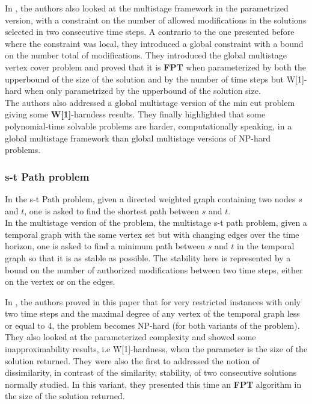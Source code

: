 \documentclass[a4paper]{book}
\begin{document}
In \cite{heeger2019multistage}, the authors also looked at the multistage framework in the parametrized version, with a constraint on the number of allowed modifications in the solutions selected in two consecutive time steps. A contrario to the one presented before where the constraint was local, they introduced a global constraint with a bound on the number total of modifications. They introduced the {\sc global multistage vertex cover} problem and proved that it is \textbf{FPT} when parameterized by both the upperbound of the size of the solution and by the number of time steps but W[1]-hard when only parametrized by the upperbound of the solution size. \\
The authors also addressed a global multistage version of the {\sc min cut} problem giving some \textbf{W[1]}-harndess results. They finally highlighted that some polynomial-time solvable problems are harder, computationally speaking, in a global multistage framework than global multistage versions of NP-hard problems. 

\subsubsection{s-t Path problem}
In the {\sc s-t Path} problem, given a directed weighted graph containing two nodes $s$ and $t$, one is asked to find the shortest path between $s$ and $t$.\\
In the multistage version of the problem, the {\sc multistage s-t path problem}, given a temporal graph with the same vertex set but with changing edges over the time horizon, one is asked to find a minimum path between $s$ and $t$ in the temporal graph so that it is as stable as possible. The stability here is represented by a bound on the number of authorized modifications between two time steps, either on the vertex or on the edges. 

In \cite{stpath}, the authors proved in this paper 
that for very restricted instances with only two time steps and the maximal degree of any vertex of the temporal graph less or equal to 4, the problem becomes NP-hard (for both variants of the problem). They also looked at the parameterized complexity and showed some inapproximability results, i.e W[1]-hardness, when the parameter is the size of the solution returned. They were also the first to addressed the notion of dissimilarity, in contrast of the similarity, stability, of two consecutive solutions normally studied. In this variant, they presented this time an \textbf{FPT} algorithm in the size of the solution returned. 
\end{document}
